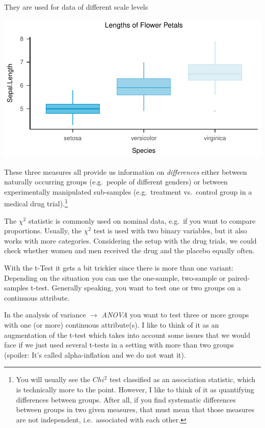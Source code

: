 \documentclass[
]{book}
\begin{document}
They are used for data of different scale levels

\includegraphics{_main_files/figure-html/unnamed-chunk-26-1.pdf}

These three measures all provide us information on \emph{differences} either between naturally occurring groups (e.g.~people of different genders) or between experimentally manipulated sub-samples (e.g.~treatment vs.~control group in a medical drug trial).\footnote{You will usually see the \(Chi^2\) test classified as an association statistic, which is technically more to the point. However, I like to think of it as quantifying differences between groups. After all, if you find systematic differences between groups in two given measures, that must mean that those measures are not independent, i.e.~associated with each other.}

The \(\chi^2\) statistic is commonly used on nominal data, e.g.~if you want to compare proportions.
Usually, the \(\chi^2\) test is used with two binary variables, but it also works with more categories.
Considering the setup with the drug trials, we could check whether women and men received the drug and the placebo equally often.

With the t-Test it gets a bit trickier since there is more than one variant: Depending on the situation you can use the one-sample, two-sample or paired-samples t-test.
Generally speaking, you want to test one or two groups on a continuous attribute.

In the analysis of variance \(\rightarrow\) \emph{ANOVA} you want to test three or more groups with one (or more) continuous attribute(s).
I like to think of it as an augmentation of the t-test which takes into account some issues that we would face if we just used several t-tests in a setting with more than two groups (spoiler: It's called alpha-inflation and we do not want it).
\end{document}
